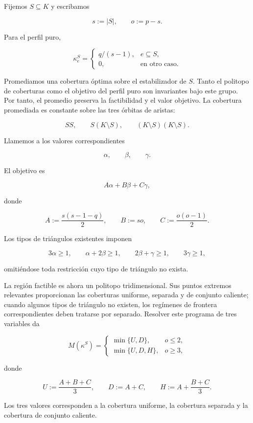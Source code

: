 \documentclass[
  spanish,
  11pt,
  a4paper,
]{article}
\begin{document}
Fijemos \(S\subseteq K\) y escribamos

\[
s:=|S|,
\qquad
o:=p-s.
\]

Para el perfil puro,

\[
\kappa_e^S
=
\begin{cases}
q/(s-1),&e\subseteq S,\\
0,&\text{en otro caso}.
\end{cases}
\tag{6.1}
\]

Promediamos una cobertura óptima sobre el estabilizador de \(S\). Tanto el politopo de coberturas como el objetivo del perfil puro son invariantes bajo este grupo. Por tanto, el promedio preserva la factibilidad y el valor objetivo. La cobertura promediada es constante sobre las tres órbitas de aristas:

\[
SS,\qquad
S(K\setminus S),\qquad
(K\setminus S)(K\setminus S).
\]

Llamemos a los valores correspondientes

\[
\alpha,\qquad\beta,\qquad\gamma.
\]

El objetivo es

\[
A\alpha+B\beta+C\gamma,
\tag{6.2}
\]

donde

\[
A:=\frac{s(s-1-q)}2,
\qquad
B:=so,
\qquad
C:=\frac{o(o-1)}2.
\tag{6.3}
\]

Los tipos de triángulos existentes imponen

\[
3\alpha\ge1,
\qquad
\alpha+2\beta\ge1,
\qquad
2\beta+\gamma\ge1,
\qquad
3\gamma\ge1,
\tag{6.4}
\]

omitiéndose toda restricción cuyo tipo de triángulo no exista.

La región factible es ahora un politopo tridimensional. Sus puntos extremos relevantes proporcionan las coberturas uniforme, separada y de conjunto caliente; cuando algunos tipos de triángulo no existen, los regímenes de frontera correspondientes deben tratarse por separado. Resolver este programa de tres variables da

\[
M(\kappa^S)
=
\begin{cases}
\min\{U,D\},&o\le2,\\[1mm]
\min\{U,D,H\},&o\ge3,
\end{cases}
\tag{6.5}
\]

donde

\[
U:=\frac{A+B+C}{3},
\qquad
D:=A+C,
\qquad
H:=A+\frac{B+C}{3}.
\tag{6.6}
\]

Los tres valores corresponden a la cobertura uniforme, la cobertura separada y la cobertura de conjunto caliente.
\end{document}
